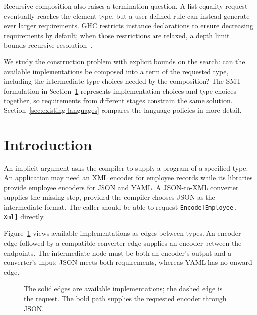 \documentclass[10pt,a4paper]{article}
\newcommand{\kw}[1]{\mathsf{#1}}
\begin{document}
Recursive composition also raises a termination question. A list-equality request
eventually reaches the element type, but a user-defined rule can instead generate
ever larger requirements. GHC restricts instance declarations to ensure decreasing
requirements by default; when those restrictions are relaxed, a depth limit
bounds recursive resolution~\cite{ghc-termination}.

We study the construction problem with explicit bounds on the search: can the
available implementations be composed into a term of the requested type, including
the intermediate type choices needed by the composition? The SMT formulation in
Section~\ref{sec:introduction} represents implementation choices and type choices
together, so requirements from different stages constrain the same solution.
Section~\ref{sec:existing-languages} compares the language policies in more detail.

\newpage
\section{Introduction}
\label{sec:introduction}
An implicit argument asks the compiler to supply a program of a specified type.
An application may need an XML encoder for employee records while its libraries
provide employee encoders for JSON and YAML. A JSON-to-XML converter supplies the
missing step, provided the compiler chooses JSON as the intermediate format.
The caller should be able to request \texttt{Encode[Employee, Xml]} directly.

Figure~\ref{fig:employee-encoding} views available implementations as edges between
types. An encoder edge followed by a compatible converter edge supplies an encoder
between the endpoints. The intermediate node must be both an encoder's output and
a converter's input; JSON meets both requirements, whereas YAML has no onward edge.
\begin{figure}[ht]
\centering
{}
\caption{The solid edges are available implementations; the dashed edge is the
request. The bold path supplies the requested encoder through JSON.}
\label{fig:employee-encoding}
\end{figure}
\end{document}
